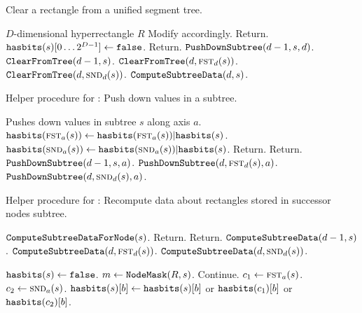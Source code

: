\documentclass[english,gradu]{tktltiki2018}
\begin{document}
\begin{algorithm}
\caption{Clear a rectangle from a unified segment tree.}\label{alg:segurm}
\begin{algorithmic}
\Require $D$-dimensional hyperrectangle $R$
\Ensure Modify \hasbits{}{} accordingly.
		\State Return.
	\EndIf
		\State $\texttt{hasbits}(s)[0\dots 2^{D-1}]\gets\texttt{false}$.
		\State Return.
	\EndIf
		\State $\texttt{PushDownSubtree}(d-1,s,d)$.
	\EndIf
	\State $\texttt{ClearFromTree}(d-1,s)$.
		\State $\texttt{ClearFromTree}(d,\textsc{fst}_{d}(s))$.
		\State $\texttt{ClearFromTree}(d,\textsc{snd}_{d}(s))$.
	\EndIf
		\State $\texttt{ComputeSubtreeData}(d,s)$.
	\EndIf
\EndProcedure
\end{algorithmic}
\end{algorithm}

\begin{algorithm}
\caption{Helper procedure for \cleardt: Push down values in a subtree.}\label{alg:segurm:pdst}
\begin{algorithmic}
	\Comment Pushes down values in subtree $s$ along axis $a$.
		\State $\texttt{hasbits}(\textsc{fst}_{a}(s))\gets \texttt{hasbits}(\textsc{fst}_{a}(s)) | \texttt{hasbits}(s)$.
		\State $\texttt{hasbits}(\textsc{snd}_{a}(s))\gets \texttt{hasbits}(\textsc{snd}_{a}(s)) | \texttt{hasbits}(s)$.
		\State Return.
		\State Return.
	\EndIf
	\State $\texttt{PushDownSubtree}(d-1,s,a)$.
		\State $\texttt{PushDownSubtree}(d,\textsc{fst}_{d}(s),a)$.
		\State $\texttt{PushDownSubtree}(d,\textsc{snd}_{d}(s),a)$.
	\EndIf
\EndProcedure
\end{algorithmic}
\end{algorithm}

\begin{algorithm}
\begin{algorithmic}
\caption{Helper procedure for \cleardt: Recompute data about rectangles stored in successor nodes subtree.}\label{alg:segurm:recomp}
		\State $\texttt{ComputeSubtreeDataForNode}(s)$.
		\State Return.
		\State Return.
	\EndIf
	\State $\texttt{ComputeSubtreeData}(d-1,s)$.
		\State $\texttt{ComputeSubtreeData}(d,\textsc{fst}_{d}(s))$.
		\State $\texttt{ComputeSubtreeData}(d,\textsc{snd}_{d}(s))$.
	\EndIf
\EndProcedure

	\State $\texttt{hasbits}(s)\gets\texttt{false}$.
	\State $m\gets\texttt{NodeMask}(R,s)$.
			\State Continue.
		\EndIf
		\State $c_1\gets\textsc{fst}_{a}(s)$.
		\State $c_2\gets\textsc{snd}_{a}(s)$.
				\State $\texttt{hasbits}(s)[b]\gets \texttt{hasbits}(s)[b]$ or $\texttt{hasbits}(c_1)[b]$ or $\texttt{hasbits}(c_2)[b]$.
			\EndIf
		\EndFor
	\EndFor
\EndProcedure
\end{algorithmic}
\end{algorithm}
\end{document}
